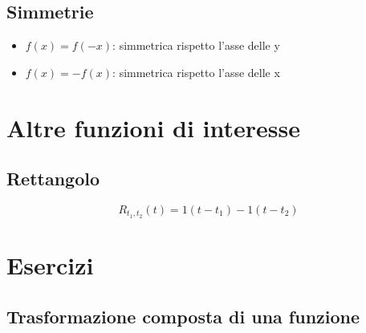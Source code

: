 \documentclass[../main.tex]{subfiles}
\begin{document}
	\subsection{Simmetrie}
	\begin{itemize}
		\item $ f(x) = f(-x) $: simmetrica rispetto l'asse delle y
		\item $ f(x) = -f(x) $: simmetrica rispetto l'asse delle x  	
	\end{itemize}
	\section{Altre funzioni di interesse}
	\subsection{Rettangolo}
	$$ R_{t_{1},t_{2}}(t) = 1(t - t_{1}) - 1(t - t_{2}) $$
	\section{Esercizi}
	\subsection{Trasformazione composta di una funzione}
\end{document}
